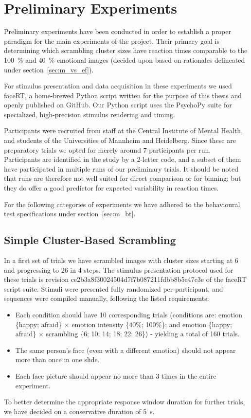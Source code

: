     \section{Preliminary Experiments}\label{sec:m_pe}
	Preliminary experiments have been conducted in order to establish a proper paradigm for the main experiments of the project. 
	Their primary goal is determining which scrambling cluster sizes have reaction times comparable to the \SI{100}{\percent} and \SI{40}{\percent} emotional images (decided upon based on rationales delineated under section~\ref{sec:m_vs_ef}).
	
	For stimulus presentation and data acquisition in these experiments we used faceRT\cite{faceRT}, a home-brewed Python script written for the purpose of this thesis and openly published on GitHub.
	Our Python script uses the PsychoPy suite\cite{Peirce2008} for specialized, high-precision stimulus rendering and timing.
	
	Participants were recruited from staff at the Central Institute of Mental Health, and students of the Universities of Mannheim and Heidelberg.
	Since these are preparatory trials we opted for merely around 7 participants per run.
	Participants are identified in the study by a 2-letter code, and a subset of them have participated in multiple runs of our preliminary trials.
	It should be noted that runs are therefore not well suited for direct comparison or for binning; but they do offer a good predictor for expected variability in reaction times.
	
	For the following categories of experiments we have adhered to the behavioural test specifications under section~\ref{sec:m_bt}.  
	\subsection{Simple Cluster-Based Scrambling}\label{sec:m_pe_ss}
	    In a first set of trials we have scrambled images with cluster sizes starting at \SI{6}{\pixel} and progressing to \SI{26}{\pixel} in \SI{4}{\pixel} steps.
	    The stimulus presentation protocol used for these trials is revision \textcolor{lg}{ce2b3a8f30024504d7f7b087211fdbb8b5e47c3e} of the faceRT\cite{faceRT} script suite.
	    Stimuli were presented fully randomized per-participant, and sequences were compiled manually, following the listed requirements:
	    \begin{itemize}
		\item Each condition should have 10 corresponding trials (conditions are: emotion \{happy; afraid\} $\times$ emotion intensity \{40\%; 100\%\}; and emotion \{happy; afraid\} $\times$ scrambling \{6; 10; 14; 18; 22; 26\}) - yielding a total of 160 trials.
		\item The same person's face (even with a different emotion) should not appear more than once in one slide.
		\item Each face picture should appear no more than 3 times in the entire experiment.
	    \end{itemize}
	    To better determine the appropriate response window duration for further trials, we have decided on a conservative duration of \SI{5}{\second}.
	    
